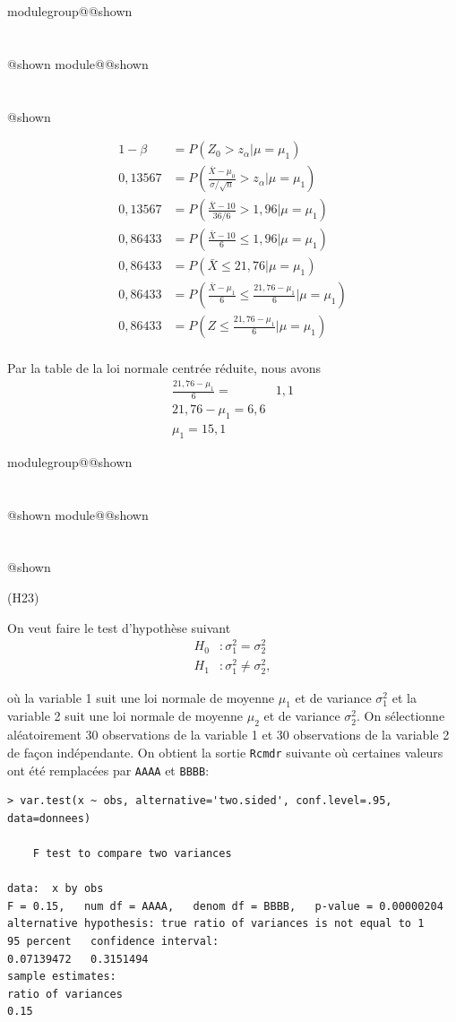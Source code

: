 \documentclass{Evaluation}
\makeatletter
\newcommand{\currentmodulekey}{}
\newcommand{\currentmoduletitle}{}
\newcommand{\currentgroupkey}{}
\newcommand{\currentgrouptitle}{}
\newcommand{\showmoduleifneeded}{%
  \ifx\currentgroupkey\empty\else
    \expandafter\ifx\csname modulegroup@\currentgroupkey @shown\endcsname\relax
      \section*{\currentgrouptitle}%
      \expandafter\gdef\csname modulegroup@\currentgroupkey @shown\endcsname{1}%
    \fi
  \fi
  \expandafter\ifx\csname module@\currentmodulekey @shown\endcsname\relax
    \section*{\currentmoduletitle}%
    \expandafter\gdef\csname module@\currentmodulekey @shown\endcsname{1}%
  \fi
}
\newenvironment{H23}{\showmoduleifneeded}{}
\makeatother
\begin{document}
\begin{questions}
\begin{H23}
\begin{solution}
    \begin{align*}
        1-\beta &= P(Z_0>z_{\alpha}|\mu=\mu_1)\\
        0,13567&= P\left(\frac{\bar{X}-\mu_0}{\sigma/\sqrt{n}}>z_{\alpha}|\mu=\mu_1\right)\\
        0,13567&= P\left(\frac{\bar{X}-10}{36/6}>1,96|\mu=\mu_1\right)\\
        0,86433&= P\left(\frac{\bar{X}-10}{6}\leq1,96|\mu=\mu_1\right)\\
        0,86433&= P\left(\bar{X}\leq21,76|\mu=\mu_1\right)\\
        0,86433&=P\left(\frac{\bar{X}-\mu_1}{6}\leq\frac{21,76-\mu_1}{6}|\mu=\mu_1\right)\\
        0,86433&=P\left(Z\leq\frac{21,76-\mu_1}{6}|\mu=\mu_1\right)\\
    \end{align*}

Par la table de la loi normale centrée réduite, nous avons
\begin{align*}
    \frac{21,76-\mu_1}{6}=&1,1\\
    21,76-\mu_1=6,6\\
    \mu_1 =15,1
\end{align*}
\end{solution}
\end{H23}

\begin{H23}
\question
(H23)

On veut faire le test d'hypothèse suivant 
\begin{align*}
H_0 &:\sigma_1^2 = \sigma_2^2\\
H_1 &:\sigma_1^2 \neq \sigma_2^2,
\end{align*}

où la variable 1 suit une loi normale de moyenne $\mu_1$ et de variance $\sigma_1^2$ et la variable 2 suit une loi normale de moyenne $\mu_2$ et de variance $\sigma_2^2$. On sélectionne aléatoirement 30 observations de la variable 1 et 30 observations de la variable 2 de façon indépendante. On obtient la sortie \texttt{Rcmdr} suivante où certaines valeurs ont été remplacées par \texttt{AAAA} et \texttt{BBBB}:

\begin{verbatim}
> var.test(x ~ obs, alternative='two.sided', conf.level=.95, data=donnees)

	F test to compare two variances

data:  x by obs
F = 0.15,   num df = AAAA,   denom df = BBBB,   p-value = 0.00000204
alternative hypothesis: true ratio of variances is not equal to 1
95 percent   confidence interval:
0.07139472   0.3151494
sample estimates:
ratio of variances 
0.15
\end{verbatim}


\end{H23}
\end{questions}
\end{document}
